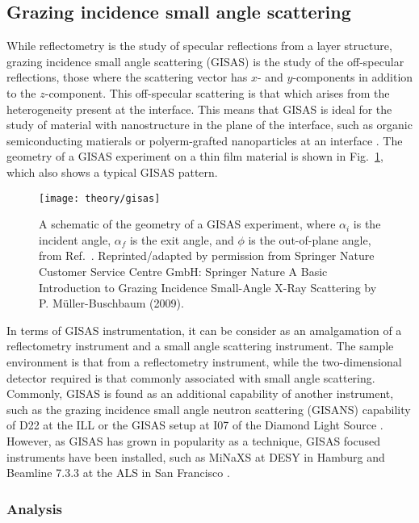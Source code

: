 \subsection{Grazing incidence small angle scattering}

While reflectometry is the study of specular reflections from a layer structure, grazing incidence small angle scattering (GISAS) is the study of the off-specular reflections, those where the scattering vector has $x$- and $y$-components in addition to the $z$-component.
This off-specular scattering is that which arises from the heterogeneity present at the interface.
This means that GISAS is ideal for the study of material with nanostructure in the plane of the interface, such as organic semiconducting matierals or polyerm-grafted nanoparticles at an interface \cite{MullerBuschbaum2005,Zhang2017}.
The geometry of a GISAS experiment on a thin film material is shown in Fig.~\ref{fig:gisas}, which also shows a typical GISAS pattern.
%
\begin{figure}
	\centering
	\texttt{[image: theory/gisas]}
	\caption{A schematic of the geometry of a GISAS experiment, where $\alpha_i$ is the incident angle, $\alpha_f$ is the exit angle, and $\phi$ is the out-of-plane angle, from Ref.~\cite{MuellerBuschbaum2009}. Reprinted/adapted by permission from Springer Nature Customer Service Centre GmbH: Springer Nature A Basic Introduction to Grazing Incidence Small-Angle X-Ray Scattering by P. M\"{u}ller-Buschbaum\textsuperscript{\textcopyright} (2009).}
	\label{fig:gisas}
\end{figure}
%

In terms of GISAS instrumentation, it can be consider as an amalgamation of a reflectometry instrument and a small angle scattering instrument.
The sample environment is that from a reflectometry instrument, while the two-dimensional detector required is that commonly associated with small angle scattering.
Commonly, GISAS is found as an additional capability of another instrument, such as the grazing incidence small angle neutron scattering (GISANS) capability of D22 at the ILL or the GISAS setup at I07 of the Diamond Light Source \cite{MullerBuschbaum2004,Nicklin2016}.
However, as GISAS has grown in popularity as a technique, GISAS focused instruments have been installed, such as MiNaXS at DESY in Hamburg and Beamline 7.3.3 at the ALS in San Francisco \cite{Buffet2012,Hexemer2010}.

\subsubsection{Analysis}


